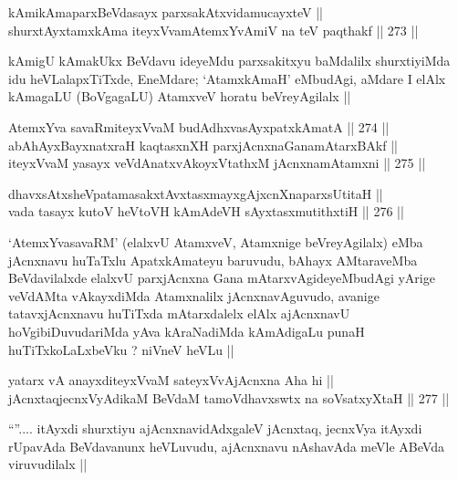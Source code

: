 
\begin{shl}
kAmikAmaparxBeVdasayx parxsakAtxvidamucayxteV || \\
shurxtAyx\s \s tamxkAma iteyxVvamAtemxYvAmiV na teV paqthakf ||  273 ||  
\end{shl}

\begin{artha}
kAmigU kAmakUkx BeVdavu ideyeMdu parxsakitxyu baMdalilx shurxtiyiMda
idu heVLalapxTiTxde, EneMdare; `AtamxkAmaH' eMbudAgi, aMdare I elAlx
kAmagaLU (BoVgagaLU) AtamxveV horatu beVreyAgilalx ||
\end{artha}


\begin{shl}
AtemxYva savaRmiteyxVvaM budAdhxvasAyx\s \s patxkAmatA ||  274 ||  \\
abAhAyxBayxnatxraH kaqtasxnXH parxjAcnxnaGanamAtarxBAkf || \\
iteyxVvaM yasayx veVdAnatxvAkoyxVtathxM jAcnxnamAtamxni ||  275 ||  
\end{shl}
				
\begin{shl}
dhavxsAtxsheVpatamasakxtAvxtasxmayxgAjxcnXnaparxsUtitaH || \\
vada tasayx kutoV heVtoVH kAmAdeVH sAyxtasxmutithxtiH ||  276 ||  
\end{shl}

\begin{artha}
`AtemxYvasavaRM' (elalxvU AtamxveV, Atamxnige beVreyAgilalx) eMba
  jAcnxnavu huTaTxlu ApatxkAmateyu baruvudu, bAhayx AMtaraveMba
  BeVdavilalxde elalxvU parxjAcnxna Gana mAtarxvAgideyeMbudAgi yArige
  veVdAMta vAkayxdiMda Atamxnalilx jAcnxnavAguvudo, avanige
  tatavxjAcnxnavu huTiTxda mAtarxdalelx elAlx ajAcnxnavU
  hoVgibiDuvudariMda yAva kAraNadiMda kAmAdigaLu punaH
  huTiTxkoLaLxbeVku ? niVneV heVLu ||
\end{artha}


\begin{shl}
yatarx vA anayxditeyxVvaM sateyxVvAjAcnxna Aha hi || \\
jAcnxtaqjecnxVyAdikaM BeVdaM tamoVdhavxswtx na soV\s satxyXtaH ||  277 || 
\end{shl}

\begin{artha}
``\stext''.... itAyxdi shurxtiyu ajAcnxnavidAdxgaleV jAcnxtaq, jecnxVya
  itAyxdi rUpavAda BeVdavanunx heVLuvudu, ajAcnxnavu nAshavAda meVle
  ABeVda viruvudilalx ||    
\end{artha}

